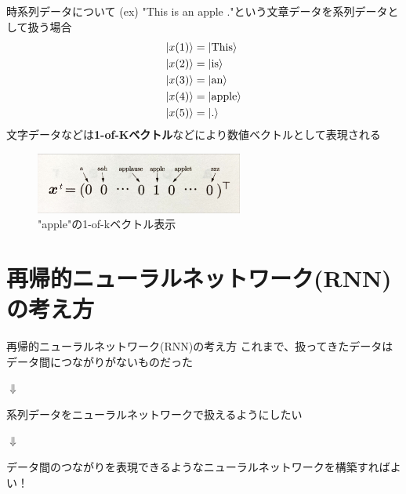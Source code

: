 \documentclass[dvipdfmx,10pt]{beamer}
\begin{document}
  \begin{frame}{時系列データについて}
    (ex) "This is an apple ."という文章データを系列データとして扱う場合
    \begin{align*}
      \ket{x(1)} &= \ket{\text{This}}\\
      \ket{x(2)} &= \ket{\text{is}}\\
      \ket{x(3)} &= \ket{\text{an}}\\
      \ket{x(4)} &= \ket{\text{apple}}\\
      \ket{x(5)} &= \ket{\text{.}}
    \end{align*}
    文字データなどは\textbf{1-of-Kベクトル}などにより数値ベクトルとして表現される
    \begin{figure}
      \begin{center}
        \includegraphics[height=2cm]{apple_vector.jpeg}
      \end{center} 
      \caption{"apple"の1-of-kベクトル表示}  
    \end{figure}
  \end{frame}

  \section{再帰的ニューラルネットワーク(RNN)の考え方}
  \begin{frame}{再帰的ニューラルネットワーク(RNN)の考え方}
    これまで、扱ってきたデータはデータ間につながりがないものだった
    \begin{center}
      $\Downarrow$
    \end{center}
    系列データをニューラルネットワークで扱えるようにしたい\\
    \begin{center}
      $\Downarrow$
    \end{center}
    データ間のつながりを表現できるようなニューラルネットワークを構築すればよい！
  \end{frame}
\end{document}
